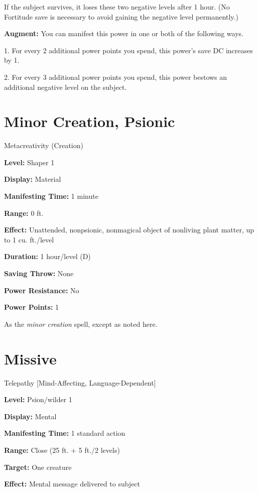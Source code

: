 \documentclass{article}
\begin{document}
If the subject survives, it loses these two negative levels after 1 hour. (No Fortitude 
save is necessary to avoid gaining the negative level permanently.)

\textbf{Augment:} You can manifest this power in one or both of the following ways.

1. For every 2 additional power points you spend, this power's save DC increases 
by 1.

2. For every 3 additional power points you spend, this power bestows an additional 
negative level on the subject.

\vspace{12pt}
\section*{Minor Creation, Psionic}

Metacreativity (Creation)

\textbf{Level:} Shaper 1

\textbf{Display:} Material

\textbf{Manifesting Time:} 1 minute

\textbf{Range:} 0 ft.

\textbf{Effect:} Unattended, nonpsionic, nonmagical object of nonliving plant matter, 
up to 1 cu. ft./level

\textbf{Duration:} 1 hour/level (D)

\textbf{Saving Throw:} None

\textbf{Power Resistance:} No

\textbf{Power Points:} 1

As the \textit{minor creation }spell, except as noted here.

\vspace{12pt}
\section*{Missive}

Telepathy [Mind-Affecting, Language-Dependent]

\textbf{Level:} Psion/wilder 1

\textbf{Display:} Mental

\textbf{Manifesting Time:} 1 standard action

\textbf{Range:} Close (25 ft. + 5 ft./2 levels)

\textbf{Target:} One creature

\textbf{Effect:} Mental message delivered to subject
\end{document}

